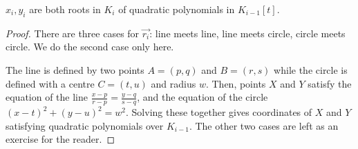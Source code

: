 \documentclass{article}
\begin{document}
\begin{nlemma}\label{lem:1.13}
    $x_i, y_i$ are both roots in $K_i$ of quadratic polynomials in $K_{i-1}[t]$.
\end{nlemma}
\begin{proof}
    There are three cases for $\vec{r_i}$: line meets line, line meets circle, circle meets circle. We do the second case only here.
    \begin{center}
    \end{center}
    The line is defined by two points $A = (p, q)$ and $B = (r, s)$ while the circle is defined with a centre $C = (t, u)$ and radius $w$.
    Then, points $X$ and $Y$ satisfy the equation of the line $\frac{x-p}{r-p} = \frac{y-q}{s-q}$, and the equation of the circle $(x-t)^2 + (y-u)^2 = w^2$.
    Solving these together gives coordinates of $X$ and $Y$ satisfying quadratic polynomials over $K_{i-1}$.
    The other two cases are left as an exercise for the reader.
\end{proof}
\end{document}
